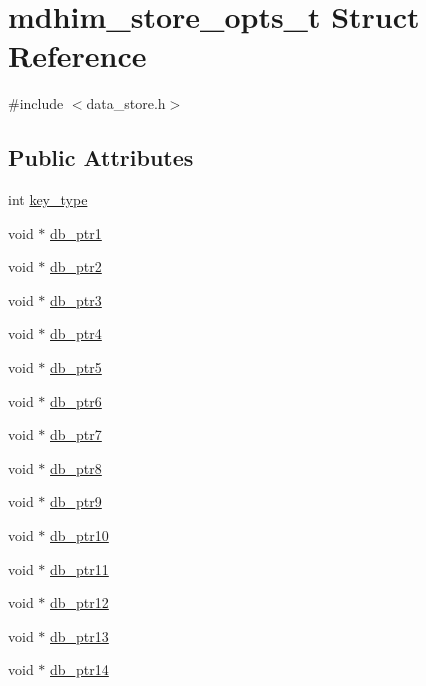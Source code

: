\hypertarget{structmdhim__store__opts__t}{\section{mdhim\-\_\-store\-\_\-opts\-\_\-t Struct Reference}
\label{structmdhim__store__opts__t}
}


{\ttfamily \#include $<$data\-\_\-store.\-h$>$}

\subsection*{Public Attributes}
\begin{DoxyCompactItemize}
\item 
int \hyperlink{structmdhim__store__opts__t_ae199c9a5bce7a85d67921eb57a5a7fe4}{key\-\_\-type}
\item 
void $\ast$ \hyperlink{structmdhim__store__opts__t_afc0af3a6b21e4c706234a0ca237597c1}{db\-\_\-ptr1}
\item 
void $\ast$ \hyperlink{structmdhim__store__opts__t_a5c50e7a4c3f39a01d4d3f367b67912db}{db\-\_\-ptr2}
\item 
void $\ast$ \hyperlink{structmdhim__store__opts__t_ad0e7fef8e634a3f76a01541ce670bf77}{db\-\_\-ptr3}
\item 
void $\ast$ \hyperlink{structmdhim__store__opts__t_aa5e8306974cbccdfbae67dff52ac2e2a}{db\-\_\-ptr4}
\item 
void $\ast$ \hyperlink{structmdhim__store__opts__t_ae7148251b76b8a249bf8cb09df837605}{db\-\_\-ptr5}
\item 
void $\ast$ \hyperlink{structmdhim__store__opts__t_ae65c05225844f3729e110abddb94aeb9}{db\-\_\-ptr6}
\item 
void $\ast$ \hyperlink{structmdhim__store__opts__t_a280ace85dd4bebfc827e13c1a4820c12}{db\-\_\-ptr7}
\item 
void $\ast$ \hyperlink{structmdhim__store__opts__t_a0a7c997946a09e9ea2a0d62d59e9c2dc}{db\-\_\-ptr8}
\item 
void $\ast$ \hyperlink{structmdhim__store__opts__t_aae91eaef3fcf5e7c81fd76cf9ace1a96}{db\-\_\-ptr9}
\item 
void $\ast$ \hyperlink{structmdhim__store__opts__t_a790c5061808fc0aceae877deba282647}{db\-\_\-ptr10}
\item 
void $\ast$ \hyperlink{structmdhim__store__opts__t_aa0f5dc33f1d601e8993e00429c3a7682}{db\-\_\-ptr11}
\item 
void $\ast$ \hyperlink{structmdhim__store__opts__t_a0dc18da5e24aab02d2420bdd1bb9c258}{db\-\_\-ptr12}
\item 
void $\ast$ \hyperlink{structmdhim__store__opts__t_a342c5e1e021ce230b2c374841ce04cb7}{db\-\_\-ptr13}
\item 
void $\ast$ \hyperlink{structmdhim__store__opts__t_ae933e626365836a21ff80dbdf4e74add}{db\-\_\-ptr14}
\end{DoxyCompactItemize}


